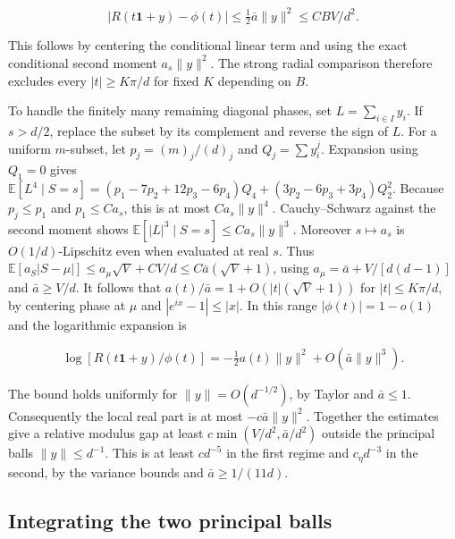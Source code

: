 \begin{equation*}
|R(t\mathbf1+y)-\phi(t)|\le \tfrac12\bar a\|y\|^2\le C B V/d^2.
\end{equation*}

This follows by centering the conditional linear term and using the exact conditional second moment $a_s\|y\|^2$. The strong radial comparison therefore excludes every $|t|\ge K\pi/d$ for fixed $K$ depending on $B$.

To handle the finitely many remaining diagonal phases, set $L=\sum_{i\in I}y_i$. If $s>d/2$, replace the subset by its complement and reverse the sign of $L$. For a uniform $m$-subset, let $p_j=(m)_j/(d)_j$ and $Q_j=\sum y_i^j$. Expansion using $Q_1=0$ gives
$\mathbb E[L^4\mid S=s]=(p_1-7p_2+12p_3-6p_4)Q_4+(3p_2-6p_3+3p_4)Q_2^2$.
Because $p_j\le p_1$ and $p_1\le C a_s$, this is at most $Ca_s\|y\|^4$. Cauchy--Schwarz against the second moment shows $\mathbb E[|L|^3\mid S=s]\le Ca_s\|y\|^3$. Moreover $s\mapsto a_s$ is $O(1/d)$-Lipschitz even when evaluated at real $s$. Thus
$\mathbb E[a_S|S-\mu|]\le a_\mu\sqrt V+CV/d\le C\bar a(\sqrt V+1)$,
using $a_\mu=\bar a+V/[d(d-1)]$ and $\bar a\ge V/d$. It follows that $a(t)/\bar a=1+O(|t|(\sqrt V+1))$ for $|t|\le K\pi/d$, by centering phase at $\mu$ and $|e^{ix}-1|\le |x|$. In this range $|\phi(t)|=1-o(1)$ and the logarithmic expansion is

\begin{equation*}
\log[R(t\mathbf1+y)/\phi(t)]=-\tfrac12 a(t)\|y\|^2+O(\bar a\|y\|^3).
\end{equation*}

The bound holds uniformly for $\|y\|=O(d^{-1/2})$, by Taylor and $\bar a\le1$. Consequently the local real part is at most $-c\bar a\|y\|^2$. Together the estimates give a relative modulus gap at least $c\min(V/d^2,\bar a/d^2)$ outside the principal balls $\|y\|\le d^{-1}$. This is at least $c d^{-5}$ in the first regime and $c_\eta d^{-3}$ in the second, by the variance bounds and $\bar a\ge1/(11d)$.

\subsection{Integrating the two principal balls}

